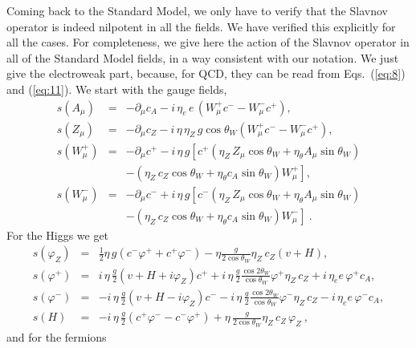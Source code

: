 \documentclass{ws-ijmpa}
\begin{document}
Coming back to the Standard Model,
we only have to verify that the
Slavnov operator is indeed nilpotent in all the fields.
We have verified this explicitly for all the cases.
For completeness,
we give
here the action of the Slavnov operator in all of the Standard Model
fields,
in a way consistent with our notation.
We just give the electroweak part, because, for QCD,
they can be read from Eqs.~(\ref{eq:8}) and (\ref{eq:11}). 
%
We start with the gauge fields,
%
\begin{eqnarray}
s(A_\mu)
&=&
-\partial_\mu c_A -i\,\eta_e\, e\,
 \left(W_\mu^+ c^- - W_\mu^- c^+ \right),
\nonumber \\[+2mm]
s(Z_\mu)
&=&
-\partial_\mu c_Z - i\,\eta\,\eta_Z\, g \cos\theta_W 
\left( W_\mu^+ c^- - W_\mu^- c^+ \right),
\nonumber\\[+2mm]
s(W_\mu^+)
&=&
-\partial_\mu c^+ - i\,\eta\, g 
\left[ c^+ \left(\eta_Z\, Z_\mu \cos\theta_W 
+ \eta_{\theta}A_\mu \sin\theta_W \right)
\right.
\nonumber\\[+2mm]
&&
\left.
- \left( \eta_Z\, c_Z \cos\theta_W 
+\eta_{\theta} c_A \sin\theta_W \right)  W_\mu^+
\right],
\nonumber\\[+2mm]
s(W_\mu^-)
&=&
-\partial_\mu c^- + i\,\eta\,  g 
\left[ c^- \left(\eta_Z\,Z_\mu \cos\theta_W 
+ \eta_{\theta}A_\mu \sin\theta_W \right) 
\right.
\nonumber\\[+2mm]
&&
\left.
- \left( \eta_Z\,c_Z \cos\theta_W 
+ \eta_{\theta}c_A \sin\theta_W \right)  W_\mu^-
  \right] \ .
\label{eq:14}
\end{eqnarray}
%
For the Higgs we get
%
\begin{eqnarray}
s(\varphi_Z)
&=&
\displaystyle
  \frac{1}{2}\eta\, g \left(c^- \varphi^+ +
c^+ \varphi^- \right) -\eta \frac{g}{2 \cos\theta_W}\eta_Z\,
 c_Z (v + H),
\nonumber\\[+2mm]
s(\varphi^+)
&=&
\displaystyle
i\,\eta\, \frac{g}{2} (v + H + i \varphi_Z) c^+ 
+ i\,\eta\, \frac{g}{2}  \frac{\cos 2\theta_W}{\cos\theta_W} \varphi^+
\eta_Z\, c_Z
+ i\, \eta_e e\, \varphi^+ c_A,
\nonumber\\[+2mm]
s(\varphi^-)
&=&
\displaystyle
 -i\,\eta\, \frac{g}{2} (v + H - i \varphi_Z) c^- 
- i\,\eta\, \frac{g}{2}  \frac{\cos 2\theta_W}{\cos\theta_W} \varphi^-
\eta_Z\, c_Z - i\,\eta_e  e\, \varphi^- c_A,
\nonumber\\[+2mm]
s(H)
&=& 
-i\,\eta\, \frac{g}{2} ( c^+ \varphi^- - c^- \varphi^+)  
+ \eta\, \frac{g}{2\cos\theta_W} \eta_Z\, c_Z\, \varphi_Z\ ,
\label{eq:15}
\end{eqnarray}
%
and for the fermions
\end{document}
